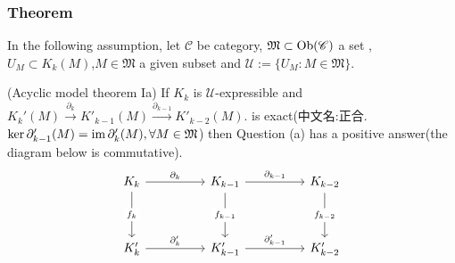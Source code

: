 \documentclass{article}
\begin{document}
\subsubsection{Theorem}
In the following assumption, let $\mathscr{C}$ be category, $\mathfrak{M} \subset \operatorname{Ob}(\mathscr{C})$ a set , $U_M \subset K_k(M)$,$M \in \mathfrak{M}$ a given subset and $\mathcal{U} := \{U_M : M \in \mathfrak{M}\}$.
\begin{theorem}
    (Acyclic model theorem Ia) If $K_k$ is $\mathcal{U}$-expressible and $K_k'(M) \xrightarrow{\partial_k}K'_{k-1}(M)\xrightarrow{\partial_{k-1}}K'_{k-2}(M)$. is exact(中文名:正合.$\ker \partial'_{k-1}(M) = \operatorname{im} \partial'_k(M),\forall M \in \mathfrak{M}$) then Question (a) has a positive answer(the diagram below is commutative).
    \[\begin{tikzcd}
        {K_k} && {K_{k-1}} && {K_{k-2}} \\
        \\
        {K_k'} && {K_{k-1}'} && {K_{k-2}'}
        \arrow["{f_k}"{description}, from=1-1, to=3-1]
        \arrow["{\partial_k}", from=1-1, to=1-3]
        \arrow["{f_{k-1}}"{description}, from=1-3, to=3-3]
        \arrow["{f_{k-2}}"{description}, from=1-5, to=3-5]
        \arrow["{\partial_{k-1}}", from=1-3, to=1-5]
        \arrow["{\partial'_k}", from=3-1, to=3-3]
        \arrow["{\partial'_{k-1}}", from=3-3, to=3-5]
    \end{tikzcd}\]
    \label{the:3.4.1}
\end{theorem}
\end{document}

